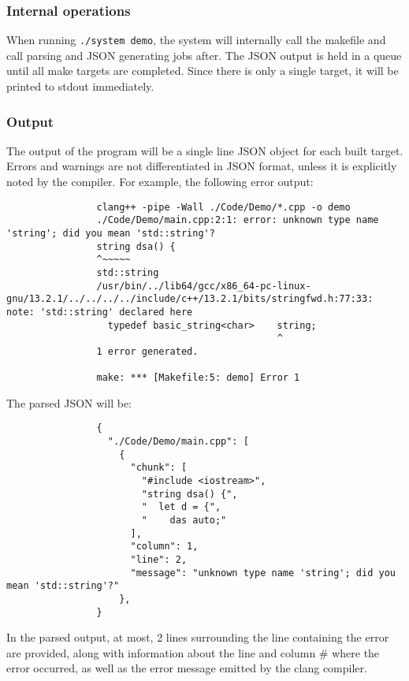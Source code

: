 \documentclass{article}
\begin{document}
		\subsubsection{Internal operations}
			When running \texttt{./system demo}, the system will internally call the makefile and call parsing and JSON generating jobs after. The JSON output is held in a queue until all make targets are completed. Since there is only a single target, it will be printed to stdout immediately.
		\subsubsection{Output}
			The output of the program will be a single line JSON object for each built target. Errors and warnings are not differentiated in JSON format, unless it is explicitly noted by the compiler. For example, the following error output:
			\begin{verbatim}
				clang++ -pipe -Wall ./Code/Demo/*.cpp -o demo
				./Code/Demo/main.cpp:2:1: error: unknown type name 'string'; did you mean 'std::string'?
				string dsa() {
				^~~~~~
				std::string
				/usr/bin/../lib64/gcc/x86_64-pc-linux-gnu/13.2.1/../../../../include/c++/13.2.1/bits/stringfwd.h:77:33: note: 'std::string' declared here
				  typedef basic_string<char>    string;   
				                                ^
				1 error generated.

				make: *** [Makefile:5: demo] Error 1
			\end{verbatim}
			The parsed JSON will be:
			\begin{verbatim}
				{
				  "./Code/Demo/main.cpp": [
				    {
				      "chunk": [
				        "#include <iostream>",
				        "string dsa() {",
				        "  let d = {",
				        "    das auto;"
				      ],
				      "column": 1,
				      "line": 2,
				      "message": "unknown type name 'string'; did you mean 'std::string'?"
				    },
				}
			\end{verbatim}
			In the parsed output, at most, 2 lines surrounding the line containing the error are provided, along with information about the line and column \# where the error occurred, as well as the error message emitted by the clang compiler. 
\end{document}
